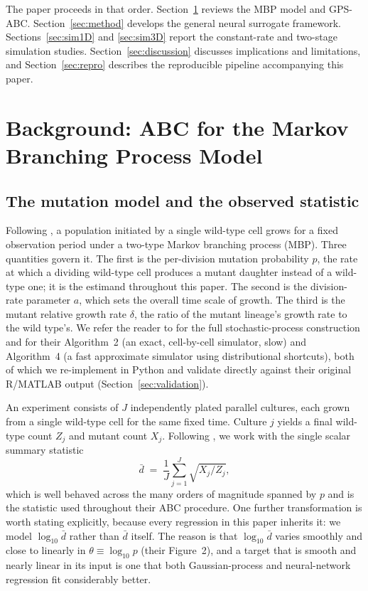 \documentclass[sn-basic,iicol,pdflatex]{sn-jnl}
\newcommand{\dbar}{\ensuremath{\bar d}}
\begin{document}
The paper proceeds in that order. Section~\ref{sec:background} reviews the MBP
model and GPS-ABC. Section~\ref{sec:method} develops the general neural
surrogate framework. Sections~\ref{sec:sim1D} and \ref{sec:sim3D} report the
constant-rate and two-stage simulation studies. Section~\ref{sec:discussion}
discusses implications and limitations, and Section~\ref{sec:repro} describes
the reproducible pipeline accompanying this paper.

\section{Background: ABC for the Markov Branching Process Model}
\label{sec:background}

\subsection{The mutation model and the observed statistic}

Following \citet{lu2023}, a population initiated by a single wild-type cell
grows for a fixed observation period under a two-type Markov branching process
(MBP). Three quantities govern it. The first is the per-division mutation
probability $p$, the rate at which a dividing wild-type cell produces a mutant
daughter instead of a wild-type one; it is the estimand throughout this paper.
The second is the division-rate parameter $a$, which sets the overall time scale
of growth. The third is the mutant relative growth rate $\delta$, the ratio of
the mutant lineage's growth rate to the wild type's. We refer the reader to \citet{lu2023} for the full stochastic-process
construction and for their Algorithm~2 (an exact, cell-by-cell simulator,
slow) and Algorithm~4 (a fast approximate simulator using distributional
shortcuts), both of which we re-implement in Python and validate directly
against their original R/MATLAB output (Section~\ref{sec:validation}).

An experiment consists of $J$ independently plated parallel cultures, each
grown from a single wild-type cell for the same fixed time. Culture $j$ yields
a final wild-type count $Z_j$ and mutant count $X_j$. Following
\citeauthor{lu2023}, we work with the single scalar summary statistic
\[
\dbar \;=\; \frac{1}{J}\sum_{j=1}^{J} \sqrt{X_j / Z_j},
\]
which is well behaved across the many orders of magnitude spanned by $p$ and is
the statistic used throughout their ABC procedure. One further transformation is
worth stating explicitly, because every regression in this paper inherits it: we
model $\log_{10}\dbar$ rather than $\dbar$ itself. The reason is that
$\log_{10}\dbar$ varies smoothly and close to linearly in $\theta \equiv
\log_{10} p$ (their Figure~2), and a target that is smooth and nearly linear in
its input is one that both Gaussian-process and neural-network regression fit
considerably better.
\end{document}

